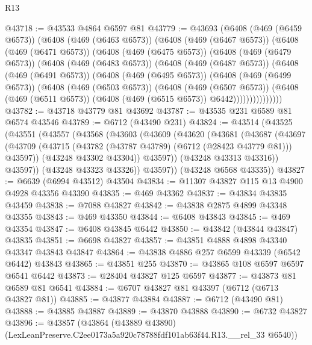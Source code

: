 \begin{lexlean}{R13}
\begin{coremodule}
@43718 := @43533 @4864 @6597 @81
@43779 := @43693
    (@6408
      (@469 (@6459 @6573))
      (@6408
        (@469 (@6463 @6573))
        (@6408
          (@469 (@6467 @6573))
          (@6408
            (@469 (@6471 @6573))
            (@6408
              (@469 (@6475 @6573))
              (@6408
                (@469 (@6479 @6573))
                (@6408
                  (@469 (@6483 @6573))
                  (@6408
                    (@469 (@6487 @6573))
                    (@6408
                      (@469 (@6491 @6573))
                      (@6408
                        (@469 (@6495 @6573))
                        (@6408
                          (@469 (@6499 @6573))
                          (@6408
                            (@469 (@6503 @6573))
                            (@6408
                              (@469 (@6507 @6573))
                              (@6408
                                (@469 (@6511 @6573))
                                (@6408 (@469 (@6515 @6573)) @6442)))))))))))))))
@43782 := @43718 @43779 @81 @43692
@43787 := @43535 @231 @6589 @81 @6574 @43546
@43789 := @6712 (@43490 @231)
@43824 := @43514
    (@43525
      (@43551
        (@43557
          (@43568
            (@43603
              (@43609
                (@43620
                  (@43681
                    (@43687
                      (@43697
                        (@43709
                          (@43715 (@43782 (@43787 @43789) (@6712 (@28423 @43779 @81))) @43597))
                        (@43248 @43302 @43304))
                      @43597))
                  (@43248 @43313 @43316))
                @43597))
            (@43248 @43323 @43326))
          @43597))
      (@43248 @6568 @43335))
@43827 := @6639 (@6994 @43512) @43504
@43834 := @11307 @43827 @115 @13 @4900 @4928 @43356 @43390
@43835 := @469 @43362
@43837 := @43834 @43835 @43459
@43838 := @7088 @43827
@43842 := @43838 @2875 @4899 @43348 @43355
@43843 := @469 @43350
@43844 := @6408 @43843
@43845 := @469 @43354
@43847 := @6408 @43845 @6442
@43850 := @43842 (@43844 @43847) @43835
@43851 := @6698 @43827
@43857 := @43851 @4888 @4898 @43340 @43347 @43843 @43847
@43864 := @43838 @4886 @257 @6599 @43339 (@6542 @6442) @43843
@43865 := @43851 @255
@43870 := @43865 @108 @6597 @6597 @6541 @6442
@43873 := @28404 @43827 @125 @6597
@43877 := @43873 @81 @6589 @81 @6541
@43884 := @6707 @43827 @81 @43397 (@6712 (@6713 @43827 @81))
@43885 := @43877 @43884
@43887 := @6712 (@43490 @81)
@43888 := @43885 @43887
@43889 := @43870 @43888
@43890 := @6732 @43827
@43896 := @43857
    (@43864 (@43889 @43890) (LexLeanPreserve.C2ee0173a5a920c78788fdf101ab63f44.R13.__rel_33 @6540))

\end{coremodule}
\end{lexlean}
